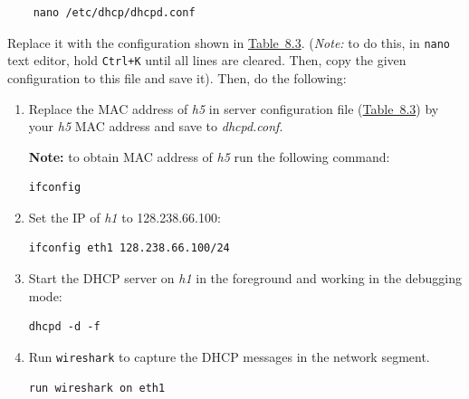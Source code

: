 \documentclass{UTNetLab}
\begin{document}
    \begin{lstlisting}
	nano /etc/dhcp/dhcpd.conf
    \end{lstlisting}
    
    Replace it with the configuration shown in \hyperref[tab:8.3]{Table~8.3}. (\textit{Note: }to do this, in \lstinline{nano} text editor, hold \lstinline{Ctrl+K} until all lines are cleared. Then, copy the given configuration to this file and save it). Then, do the following:

    \begin{enumerate}
        \item Replace the MAC address of \textit{h5} in server configuration file (\hyperref[tab:8.3]{Table~8.3}) by your \textit{h5} MAC address and save to \textit{dhcpd.conf}.
        
         \textbf{Note: }to obtain MAC address of \textit{h5} run the following command:
        
    \begin{lstlisting}[xleftmargin=0.05in]
    ifconfig
    \end{lstlisting}
                
    \item Set the IP of \textit{h1} to {128.238.66.100}:
        
    \begin{lstlisting}[xleftmargin=0.05in]
     ifconfig eth1 128.238.66.100/24
   	\end{lstlisting}
     	
     	
   \item Start the DHCP server on \textit{h1} in the foreground and working in the debugging mode:
        
    \begin{lstlisting}[xleftmargin=0.05in]
    dhcpd -d -f
    \end{lstlisting}

        
    \item Run \lstinline{wireshark} to capture the DHCP messages in the network segment.
            
    \begin{lstlisting}[xleftmargin=0.05in]
	run wireshark on eth1
    \end{lstlisting}
        

\end{enumerate}
\end{document}
